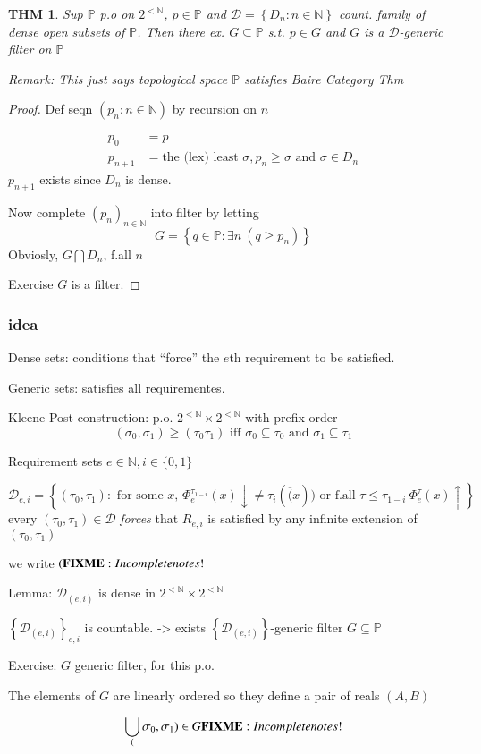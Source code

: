\documentclass[12pt]{article}
\newcommand{\Nat}{\ensuremath{\mathbb{N}}}
\newcommand{\Conj}[1]{\ensuremath{\overline{#1}}}
\newcommand{\fixme}{\\ \textbf{FIXME}: Incomplete notes!}
\begin{document}
\newtheorem*{thm}{THM}
\begin{thm}
Sup $\mathbb{P}$ p.o on $2^{< \Nat}$, $p \in \mathbb{P}$ and $\mathcal{D} = \left\{D_n : n \in \Nat \right\}$
count. family of dense open subsets of $\mathbb{P}$.
Then there ex. $G \subseteq \mathbb{P}$ s.t. $p \in G$ and $G$ is a $\mathcal{D}$-generic filter on $\mathbb{P}$

Remark: This just says topological space $\mathbb{P}$ satisfies Baire Category Thm
\end{thm}
\begin{proof}
  Def seqn $(p_n : n \in \Nat)$ by recursion on $n$

  \begin{align*}
    p_0 &= p \\
    p_{n+1} &= \text{the (lex) least } \sigma, p_n \ge \sigma \text{ and } \sigma \in D_n
  \end{align*}
  $p_{n+1}$ exists since $D_n$ is dense.

  Now complete $(p_n)_{n \in \Nat}$ into filter by letting
  \[ G = \left\{q \in \mathbb{P} : \exists n\ (q \ge p_n ) \right\} \]
  Obviosly, $G \bigcap D_n$, f.all $n$

  Exercise $G$ is a filter.
\end{proof}

\subsubsection*{idea}
Dense sets: conditions that ``force'' the $e$th requirement to be satisfied.

Generic sets: satisfies all requirementes.

Kleene-Post-construction:
p.o. $2^{<\Nat} \times 2^{<\Nat}$ with prefix-order
\[
(\sigma_0, \sigma_1) \ge ( \tau_0 \tau_1) \text{ iff } 
        \sigma_0 \subseteq \tau_0 \text{ and } \sigma_1 \subseteq \tau_1
\]

Requirement sets
$e \in \Nat, i \in \{0,1\}$ 

\[
\mathcal{D}_{e,i} =\left\{  
(\tau_0, \tau_1): \text{ for some $x$, }
\Phi^{\tau_{1-i}}_e(x) \downarrow \ne \tau_i ( \Conj(x))
\text{ or f.all } \tau \le \tau_{1-i} \ \Phi^\tau_e(x) \uparrow \right\}
\]
every $(\tau_0, \tau_1) \in \mathcal{D}$ \emph{forces} that 
$R_{e,i}$ is satisfied by any infinite extension of $(\tau_0, \tau_1)$

we write $(\fixme$


Lemma: $\mathcal{D}_{(e,i)}$ is dense in $2^{<\Nat} \times 2^{<\Nat}$

$\left\{\mathcal{D}_{(e,i)}\right\}_{e,i}$ is countable.
-> exists $\left\{\mathcal{D}_{(e,i)}\right\}$-generic filter
$G \subseteq \mathbb{P}$



Exercise:
$G$ generic filter, 
for this p.o.

The elements of $G$ are linearly ordered so they define a pair of reals $(A,B)$

\[
\bigcup_(\sigma_0, \sigma_1) \in G \fixme
\]
\end{document}
